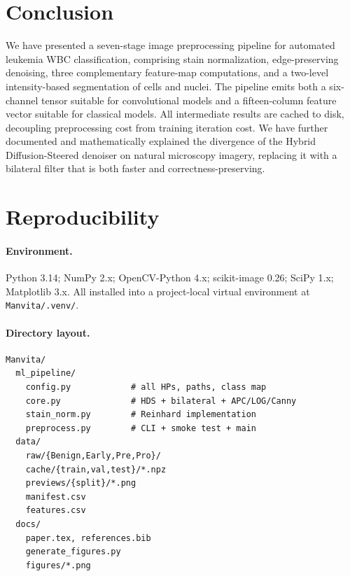 \documentclass[conference,10pt]{IEEEtran}
\begin{document}
\section{Conclusion}
\label{sec:conclusion}

We have presented a seven-stage image preprocessing pipeline for automated leukemia WBC classification, comprising stain normalization, edge-preserving denoising, three complementary feature-map computations, and a two-level intensity-based segmentation of cells and nuclei. The pipeline emits both a six-channel tensor suitable for convolutional models and a fifteen-column feature vector suitable for classical models. All intermediate results are cached to disk, decoupling preprocessing cost from training iteration cost. We have further documented and mathematically explained the divergence of the Hybrid Diffusion-Steered denoiser on natural microscopy imagery, replacing it with a bilateral filter that is both faster and correctness-preserving.

\appendices

\section{Reproducibility}
\label{app:repro}
\paragraph{Environment.} Python 3.14; NumPy 2.x; OpenCV-Python 4.x; scikit-image 0.26; SciPy 1.x; Matplotlib 3.x. All installed into a project-local virtual environment at \texttt{Manvita/.venv/}.

\paragraph{Directory layout.}
\begin{lstlisting}
Manvita/
  ml_pipeline/
    config.py            # all HPs, paths, class map
    core.py              # HDS + bilateral + APC/LOG/Canny
    stain_norm.py        # Reinhard implementation
    preprocess.py        # CLI + smoke test + main
  data/
    raw/{Benign,Early,Pre,Pro}/
    cache/{train,val,test}/*.npz
    previews/{split}/*.png
    manifest.csv
    features.csv
  docs/
    paper.tex, references.bib
    generate_figures.py
    figures/*.png
\end{lstlisting}
\end{document}
